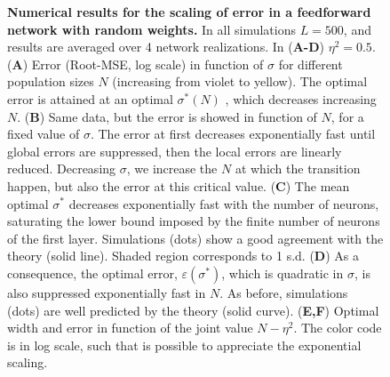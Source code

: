 \documentclass[a4paper]{article}%
\begin{document}
\begin{figure}[p]
\centering
{}\caption{ \textbf{Numerical
results for the scaling of error in a feedforward network with random
weights.} In all simulations $L=500$, and results are averaged over 4 network
realizations. In (\textbf{A-D}) $\eta^{2} =0.5$. (\textbf{A}) Error (Root-MSE,
log scale) in function of $\sigma$ for different population sizes $N$
(increasing from violet to yellow). The optimal error is attained at an
optimal $\sigma^{*}(N)$ , which decreases increasing $N$. (\textbf{B}) Same
data, but the error is showed in function of $N$, for a fixed value of
$\sigma$. The error at first decreases exponentially fast until global errors
are suppressed, then the local errors are linearly reduced. Decreasing
$\sigma$, we increase the $N$ at which the transition happen, but also the
error at this critical value. (\textbf{C}) The mean optimal $\sigma^{*}$
decreases exponentially fast with the number of neurons, saturating the lower
bound imposed by the finite number of neurons of the first layer. Simulations
(dots) show a good agreement with the theory (solid line). Shaded region
corresponds to 1 s.d. (\textbf{D}) As a consequence, the optimal error,
$\varepsilon(\sigma^{*})$, which is quadratic in $\sigma$, is also suppressed
exponentially fast in $N$. As before, simulations (dots) are well predicted by
the theory (solid curve). (\textbf{E,F}) Optimal width and error in function
of the joint value $N-\eta^{2}$. The color code is in log scale, such that is
possible to appreciate the exponential scaling. }%
\label{Fig:4}%
\end{figure}\clearpage
\end{document}
